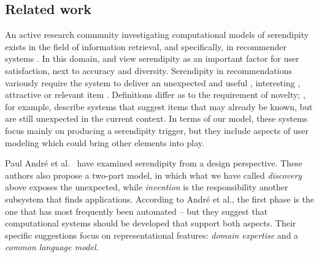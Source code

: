 \subsection{Related work} \label{sec:related}

An active research community investigating computational models of serendipity exists in the field of information retrieval, and specifically, in recommender systems \cite{Toms2000}. In this domain,  and  view serendipity as an important factor for user satisfaction, next to accuracy and diversity.  Serendipity in recommendations variously require the system to deliver an unexpected and useful \cite{Lu2012}, interesting \cite{Herlocker2004}, attractive or relevant item \cite{Ge2010}. 
Definitions differ as to the requirement of novelty; , for example, describe systems that suggest items that may already be known, but are still unexpected in the current context.  In terms of our model, these systems focus mainly on producing a serendipity trigger, but they include aspects of user modeling which could bring other elements into play.

Paul Andr{\'e} et al.~\citeyear{andre2009discovery} have examined
serendipity from a design perspective.  These authors also propose a
two-part model, in which what we have called \emph{discovery} above
exposes the unexpected, while \emph{invention} is the responsibility
another subsystem that finds applications.  According to Andr\'e et
al., the first phase is the one that has most frequently been
automated -- but they suggest that computational systems should be
developed that support both aspects.  Their specific suggestions focus
on representational features: \emph{domain expertise} and a
\emph{common language model}.

